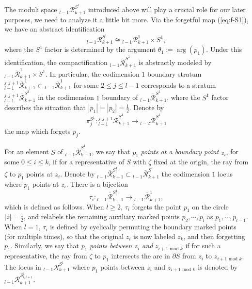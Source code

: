 \documentclass[a4paper]{article}
\numberwithin{equation}{section}
\begin{document}
The moduli space ${}_{l-1}\mathcal{R}_{k+1}^{S^1}$ introduced above will play a crucial role for our later purposes, we need to analyze it a little bit more. Via the forgetful map (\ref{eq:f-S1}), we have an abstract identification
\begin{equation}
{}_{l-1}\mathcal{R}_{k+1}^{S^1}\cong{}_{l-1}\mathcal{R}_{k+1}^1\times S^1,
\end{equation}
where the $S^1$ factor is determined by the argument $\theta_1:=\arg(p_1)$. Under this identification, the compactification ${}_{l-1}\overline{\mathcal{R}}_{k+1}^{S^1}$ is abstractly modeled by ${}_{l-1}\overline{\mathcal{R}}_{k+1}^1\times S^1$. In particular, the codimension $1$ boundary stratum ${}_{l-1}^{j,j+1}\overline{\mathcal{R}}_{k+1}^1\subset{}_{l-1}\overline{\mathcal{R}}_{k+1}^1$ for some $2\leq j\leq l-1$ corresponds to a stratum ${}_{l-1}^{j,j+1}\overline{\mathcal{R}}_{k+1}^{S^1}$ in the codimension $1$ boundary of ${}_{l-1}\overline{\mathcal{R}}_{k+1}^{S^1}$, where the $S^1$ factor describes the situation that $|p_1|=|p_2|=\frac{1}{2}$. Denote by
\begin{equation}
\pi_j^{S^1}:{}_{l-1}^{j,j+1}\overline{\mathcal{R}}_{k+1}^{S^1}\rightarrow{}_{l-2}\overline{\mathcal{R}}_{k+1}^{S^1}
\end{equation}
the map which forgets $p_j$. 

For an element $S$ of ${}_{l-1}\overline{\mathcal{R}}_{k+1}^{S^1}$, we say that $p_1$ \textit{points at a boundary point} $z_i$, for some $0\leq i\leq k$, if for a representative of $S$ with $\zeta$ fixed at the origin, the ray from $\zeta$ to $p_1$ points at $z_i$. Denote by ${}_{l-1}\overline{\mathcal{R}}_{k+1}^{S_i^1}\subset{}_{l-1}\overline{\mathcal{R}}_{k+1}^{S^1}$ the codimension $1$ locus where $p_1$ points at $z_i$. There is a bijection
\begin{equation}
\tau_i:{}_{l-1}\overline{\mathcal{R}}_{k+1}^{S_i^1}\rightarrow{}_{l-1}\overline{\mathcal{R}}_{k+1}^1,
\end{equation}
which is defined as follows. When $l\geq2$, $\tau_i$ forgets the point $p_1$ on the circle $|z|=\frac{1}{2}$, and relabels the remaining auxiliary marked points $p_2,\cdots,p_l$ as $p_1,\cdots,p_{l-1}$. When $l=1$, $\tau_i$ is defined by cyclically permuting the boundary marked points (for multiple times), so that the original $z_i$ is now labeled $z_k$, and then forgetting $p_1$. Similarly, we say that $p_1$ \textit{points between $z_i$ and} $z_{i+1\textrm{ mod }k}$ if for such a representative, the ray from $\zeta$ to $p_1$ intersects the arc in $\partial S$ from $z_i$ to $z_{i+1\textrm{ mod }k}$. The locus in ${}_{l-1}\mathcal{R}_{k+1}^{S^1}$ where $p_1$ points between $z_i$ and $z_{i+1\textrm{ mod }k}$ is denoted by ${}_{l-1}\mathcal{R}_{k+1}^{S_{i,i+1}^1}$.
\end{document}
